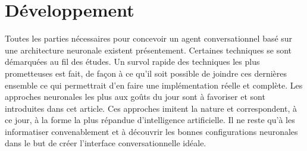 \section{Développement}
Toutes les parties nécessaires pour concevoir un agent conversationnel basé sur une architecture neuronale existent présentement. Certaines techniques se sont démarquées au fil des études. Un survol rapide des techniques les plus prometteuses est fait, de façon à ce qu'il soit possible de joindre ces dernières ensemble ce qui permettrait d'en faire une implémentation réelle et complète. Les approches neuronales les plus aux goûts du jour sont à favoriser et sont introduites dans cet article. Ces approches imitent la nature et correspondent, à ce jour, à la forme la plus répandue d'intelligence artificielle. Il ne reste qu'à les informatiser convenablement et à découvrir les bonnes configurations neuronales dans le but de créer l'interface conversationnelle idéale. \\






